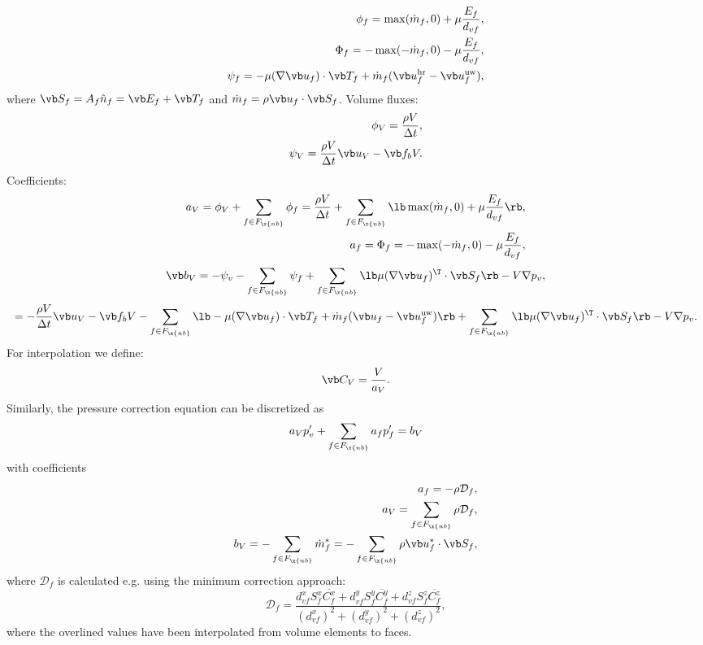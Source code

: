 \documentclass[12pt]{article}
\newcommand{\fnb}{F_{\x{nb}}}
\begin{document}
\begin{align}
  \phi_f = \max(\dot m_f, 0) + \mu \frac{E_f}{d_{vf}}, \\
  \Phi_f = -\max(-\dot m_f, 0) - \mu \frac{E_f}{d_{vf}}, \\
  \psi_f = - \mu (\nabla \vb u_f) \cdot \vb T_f + \dot m_f (\vb u_f^{\text{hr}} - \vb u_f^{\text{uw}}),
\end{align}
where $\vb S_f = A_f \hat n_f = \vb E_f + \vb T_f$ and $\dot m_f = \rho \vb u_f \cdot \vb S_f$.
Volume fluxes:
\begin{align}
  \phi_V = \frac{\rho V}{\Delta t}, \\
  \psi_V = \frac{\rho V}{\Delta t} \vb u_V - \vb f_b V.
\end{align}
Coefficients:
\begin{align}
  a_V = \phi_V + \sum_{f \in \fnb} \phi_f = \frac{\rho V}{\Delta t} + \sum_{f \in \fnb} \lb \max(\dot m_f, 0) + \mu \frac{E_f}{d_{vf}} \rb, \\
  a_f = \Phi_f = -\max(-\dot m_f, 0) - \mu \frac{E_f}{d_{vf}},
\end{align}
\begin{equation}
  \vb b_V = -\psi_v - \sum_{f \in \fnb} \psi_f + \sum_{f \in \fnb} \lb \mu (\nabla \vb u_f)^\T \cdot \vb S_f \rb - V \nabla p_v,
\end{equation}
$$
= - \frac{\rho V}{\Delta t} \vb u_V - \vb f_b V - \sum_{f \in \fnb} \lb - \mu (\nabla \vb u_f) \cdot \vb T_f + \dot m_f (\vb u_f - \vb u_f^{\text{uw}}) \rb + \sum_{f \in \fnb} \lb \mu (\nabla \vb u_f)^\T \cdot \vb S_f \rb - V \nabla p_v.
$$
For interpolation we define:
$$
\vb C_V = \frac{V}{a_V}.
$$
Similarly, the pressure correction equation can be discretized as \cite{mou}
\begin{equation}
  a_V p_v' + \sum_{f \in \fnb} a_f p_f' = b_V
\end{equation}
with coefficients
\begin{align}
  a_f = -\rho \mathcal{D}_f, \\
  a_V = \sum_{f \in \fnb} \rho \mathcal{D}_f,\\
  b_V = - \sum_{f \in \fnb} \dot m_f^* = - \sum_{f \in \fnb} \rho \vb u_f^* \cdot \vb S_f,
\end{align}
where $\mathcal{D}_f$ is calculated e.g. using the minimum correction approach:
$$
\mathcal{D}_f = \frac{d_{vf}^x S_f^x \overline{C_f^x} + d_{vf}^y S_f^y \overline{C_f^y} + d_{vf}^z S_f^z \overline{C_f^z}}{(d_{vf}^x)^2 + (d_{vf}^y)^2 + (d_{vf}^z)^2},
$$
where the overlined values have been interpolated from volume elements to faces.
\end{document}
